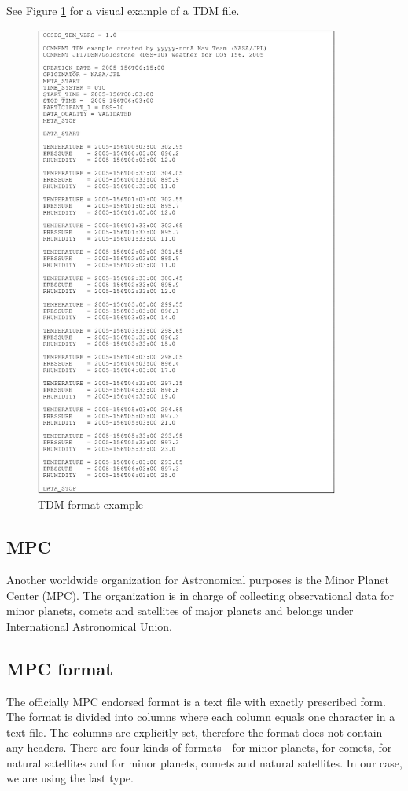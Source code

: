 	See Figure \ref{fig:tdm_example} for a visual example of a TDM file.
	
	\begin{figure}[H]
	\centering
	  \includegraphics[width=10cm]{images/tdm_example}
		  \caption{TDM format example}
	  \label{fig:tdm_example}
	\end{figure}
		
\subsection{MPC}\label{sec:mpc}

	Another worldwide organization for Astronomical purposes is the Minor Planet Center (MPC). The organization is in charge of collecting observational data for minor planets, comets and satellites of major planets and belongs under International Astronomical Union.
	
\subsection{MPC format}

	The officially MPC endorsed format is a text file with exactly prescribed form. The format is divided into columns where each column equals one character in a text file. The columns are explicitly set, therefore the format does not contain any headers. There are four kinds of formats - for minor planets, for comets, for natural satellites and for minor planets, comets and natural satellites. In our case, we are using the last type.
	
